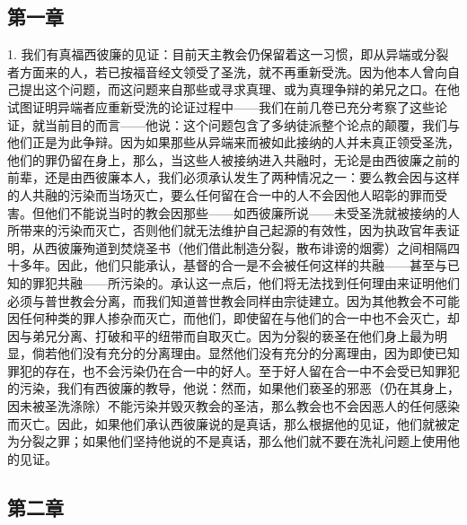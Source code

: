 \subsection{第一章}

1. 我们有真福西彼廉的见证：目前天主教会仍保留着这一习惯，即从异端或分裂者方面来的人，若已按福音经文领受了圣洗，就不再重新受洗。因为他本人曾向自己提出这个问题，而这问题来自那些或寻求真理、或为真理争辩的弟兄之口。在他试图证明异端者应重新受洗的论证过程中——我们在前几卷已充分考察了这些论证，就当前目的而言——他说：这个问题包含了多纳徒派整个论点的颠覆，我们与他们正是为此争辩。因为如果那些从异端来而被如此接纳的人并未真正领受圣洗，他们的罪仍留在身上，那么，当这些人被接纳进入共融时，无论是由西彼廉之前的前辈，还是由西彼廉本人，我们必须承认发生了两种情况之一：要么教会因与这样的人共融的污染而当场灭亡，要么任何留在合一中的人不会因他人昭彰的罪而受害。但他们不能说当时的教会因那些——如西彼廉所说——未受圣洗就被接纳的人所带来的污染而灭亡，否则他们就无法维护自己起源的有效性，因为执政官年表证明，从西彼廉殉道到焚烧圣书（他们借此制造分裂，散布诽谤的烟雾）之间相隔四十多年。因此，他们只能承认，基督的合一是不会被任何这样的共融——甚至与已知的罪犯共融——所污染的。承认这一点后，他们将无法找到任何理由来证明他们必须与普世教会分离，而我们知道普世教会同样由宗徒建立。因为其他教会不可能因任何种类的罪人掺杂而灭亡，而他们，即使留在与他们的合一中也不会灭亡，却因与弟兄分离、打破和平的纽带而自取灭亡。因为分裂的亵圣在他们身上最为明显，倘若他们没有充分的分离理由。显然他们没有充分的分离理由，因为即使已知罪犯的存在，也不会污染仍在合一中的好人。至于好人留在合一中不会受已知罪犯的污染，我们有西彼廉的教导，他说：然而，如果他们亵圣的邪恶（仍在其身上，因未被圣洗涤除）不能污染并毁灭教会的圣洁，那么教会也不会因恶人的任何感染而灭亡。因此，如果他们承认西彼廉说的是真话，那么根据他的见证，他们就被定为分裂之罪；如果他们坚持他说的不是真话，那么他们就不要在洗礼问题上使用他的见证。\par


\subsection{第二章}

